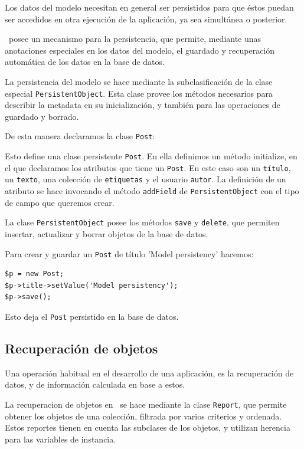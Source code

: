 Los datos del modelo necesitan en general ser persistidos para que éstos puedan ser accedidos en otra ejecución de la aplicación, ya sea simultánea o posterior.

\PWB \ posee un mecanismo para la persistencia, que permite, mediante unas anotaciones especiales en los datos del modelo, el guardado y recuperación automática de los datos en la base de datos.

La persistencia del modelo se hace mediante la subclasificación de la clase especial \verb"PersistentObject". Esta clase provee los métodos necesarios para describir la metadata en su inicialización, y también para las operaciones de guardado y borrado.

De esta manera declaramos la clase \verb"Post":

\begin{lgrind}

\end{lgrind}

Esto define una clase persistente \verb"Post". En ella definimos un método initialize, en el que declaramos los atributos que tiene un \verb"Post". En este caso son un \verb"título", un \verb"texto", una colección de \verb"etiquetas" y el usuario \verb"autor". La definición de un atributo se hace invocando el método \verb"addField" de \verb"PersistentObject" con el tipo de campo que queremos crear.

La clase \verb'PersistentObject' posee los métodos \verb'save' y \verb'delete', que permiten insertar, actualizar y borrar objetos de la base de datos.

Para crear y guardar un \verb'Post' de título 'Model persistency' hacemos:

\begin{verbatim}
$p = new Post;
$p->title->setValue('Model persistency');
$p->save();
\end{verbatim}

Esto deja el \verb'Post' persistido en la base de datos.

\subsection{Recuperación de objetos}

Una operación habitual en el desarrollo de una aplicación, es la recuperación de datos, y de información calculada en base a estos.

La recuperacion de objetos en \PWB \ se hace mediante la clase \verb"Report", que permite obtener los objetos de una colección, filtrada por varios criterios y ordenada. Estos reportes tienen en cuenta las subclases de los objetos, y utilizan herencia para las variables de instancia.

